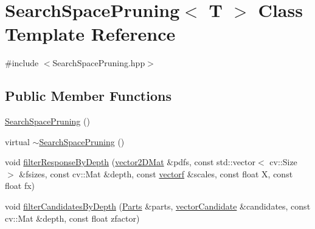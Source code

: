 \hypertarget{classSearchSpacePruning}{\section{Search\-Space\-Pruning$<$ T $>$ Class Template Reference}
\label{classSearchSpacePruning}
}


{\ttfamily \#include $<$Search\-Space\-Pruning.\-hpp$>$}

\subsection*{Public Member Functions}
\begin{DoxyCompactItemize}
\item 
\hyperlink{classSearchSpacePruning_acb47c8b784d33cbad5ffde38e689316b}{Search\-Space\-Pruning} ()
\item 
virtual \hyperlink{classSearchSpacePruning_a78ec6942ec11b681a1b65faf7857af9d}{$\sim$\-Search\-Space\-Pruning} ()
\item 
void \hyperlink{classSearchSpacePruning_a4f71ccfb6a90e5631467a1b5152c8fef}{filter\-Response\-By\-Depth} (\hyperlink{types_8hpp_a33cacb85be7b8df3dc0b67d5d849f4cc}{vector2\-D\-Mat} \&pdfs, const std\-::vector$<$ cv\-::\-Size $>$ \&fsizes, const cv\-::\-Mat \&depth, const \hyperlink{types_8hpp_a4da5db3ee9e284f719ef5764dbadffc8}{vectorf} \&scales, const float X, const float fx)
\item 
void \hyperlink{classSearchSpacePruning_a46a0647b44efb07ffcb61558840e4ce3}{filter\-Candidates\-By\-Depth} (\hyperlink{classParts}{Parts} \&parts, \hyperlink{types_8hpp_a04eefdf70d6c6b8effb5170271f1db05}{vector\-Candidate} \&candidates, const cv\-::\-Mat \&depth, const float zfactor)
\end{DoxyCompactItemize}


